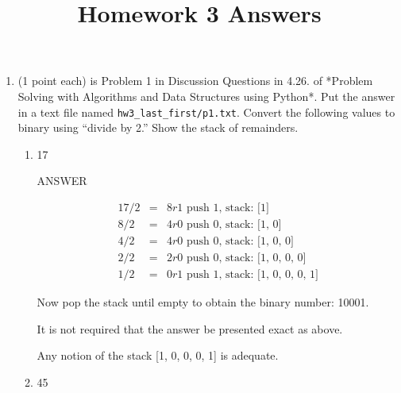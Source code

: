 \documentclass{article} %
\title{Homework 3 Answers}
\author{}
\newenvironment{mpage}
  {\hspace{0.1in}
   \begin{minipage}{4.5in}
     \setlength{\parskip}{.5em}
     \vspace{0.1in}}    
  {\vspace{0.1in}
   \end{minipage}}
\begin{document}
\maketitle

\renewcommand{\labelenumi}{Problem \arabic{enumi}}

\renewcommand{\labelenumii}{\alph{enumii})}


\begin{enumerate}

\item (1 point each) is Problem 1 in Discussion Questions in 4.26.  of
  *Problem Solving with Algorithms and Data Structures using Python*.
  Put the answer in a text file named \verb|hw3_last_first/p1.txt|.
  Convert the following values to binary using “divide by 2.” Show the
  stack of remainders.


  \begin{enumerate}
  \item
      17

      \begin{mpage}
        ANSWER
        
        \begin{eqnarray*}
          17 / 2 &=& 8 r 1 \text{ push 1, stack: [1]} \\
          8 / 2  &=& 4 r 0 \text{ push 0, stack: [1, 0]} \\
          4 / 2  &=& 4 r 0 \text{ push 0, stack: [1, 0, 0]} \\
          2 / 2  &=& 2 r 0 \text{ push 0, stack: [1, 0, 0, 0]} \\
          1 / 2  &=& 0 r 1 \text{ push 1, stack: [1, 0, 0, 0, 1]} 
        \end{eqnarray*}

        Now pop the stack until empty to obtain the binary number: 10001.

        It is not required that the answer be presented exact as above.

        Any notion of the stack [1, 0, 0, 0, 1] is adequate.
        \vspace{.1in}

      \end{mpage}

    
    \item
        45
      

\end{enumerate}
\end{enumerate}
\end{document}
